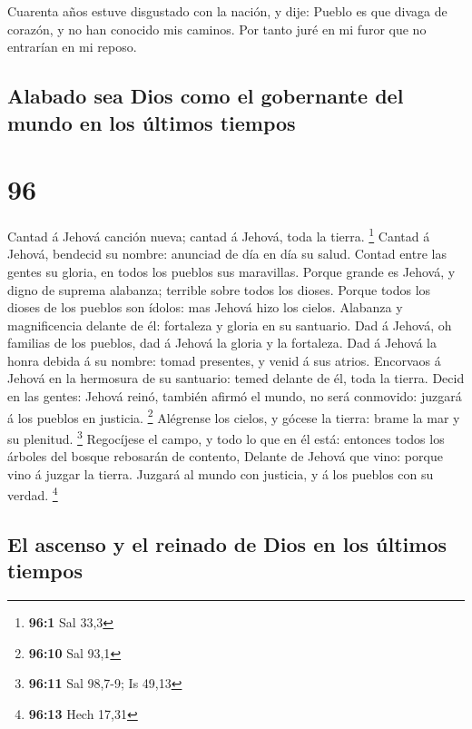  Cuarenta años estuve disgustado con la nación, y dije:
Pueblo es que divaga de corazón, y no han conocido mis caminos.
 Por tanto juré en mi furor que no entrarían en mi reposo.

\hypertarget{alabado-sea-dios-como-el-gobernante-del-mundo-en-los-uxfaltimos-tiempos}{%
\subsection{Alabado sea Dios como el gobernante del mundo en los últimos
tiempos}\label{alabado-sea-dios-como-el-gobernante-del-mundo-en-los-uxfaltimos-tiempos}}

\hypertarget{section-95}{%
\section{96}\label{section-95}}

 Cantad á Jehová canción nueva; cantad á Jehová, toda la
tierra. \footnote{\textbf{96:1} Sal 33,3}  Cantad á Jehová,
bendecid su nombre: anunciad de día en día su salud.  Contad
entre las gentes su gloria, en todos los pueblos sus maravillas.
 Porque grande es Jehová, y digno de suprema alabanza;
terrible sobre todos los dioses.  Porque todos los dioses de
los pueblos son ídolos: mas Jehová hizo los cielos. 
Alabanza y magnificencia delante de él: fortaleza y gloria en su
santuario.  Dad á Jehová, oh familias de los pueblos, dad á
Jehová la gloria y la fortaleza.  Dad á Jehová la honra
debida á su nombre: tomad presentes, y venid á sus atrios. 
Encorvaos á Jehová en la hermosura de su santuario: temed delante de él,
toda la tierra.  Decid en las gentes: Jehová reinó, también
afirmó el mundo, no será conmovido: juzgará á los pueblos en justicia.
\footnote{\textbf{96:10} Sal 93,1}  Alégrense los cielos, y
gócese la tierra: brame la mar y su plenitud. \footnote{\textbf{96:11}
  Sal 98,7-9; Is 49,13}  Regocíjese el campo, y todo lo que
en él está: entonces todos los árboles del bosque rebosarán de contento,
 Delante de Jehová que vino: porque vino á juzgar la
tierra. Juzgará al mundo con justicia, y á los pueblos con su verdad.
\footnote{\textbf{96:13} Hech 17,31}

\hypertarget{el-ascenso-y-el-reinado-de-dios-en-los-uxfaltimos-tiempos}{%
\subsection{El ascenso y el reinado de Dios en los últimos
tiempos}\label{el-ascenso-y-el-reinado-de-dios-en-los-uxfaltimos-tiempos}}

